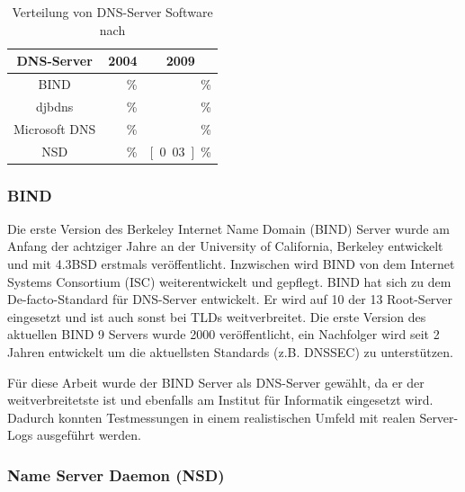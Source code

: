 \documentclass[a4paper, 12pt, BCOR10mm, DIV12, toc=bibliography, toc=listof, german]{scrbook}
\begin{document}
				\begin{table}
					\centering
					\begin{tabular}{|c|r|r|}\hline
						DNS-Server & \multicolumn{1}{c|}{2004} & \multicolumn{1}{c|}{2009} \\\hline\hline
						BIND & \unit[70,11]{\%} & \unit[73,85]{\%} \\
						djbdns & \unit[15,57]{\%} & \unit[2,56]{\%} \\
						Microsoft DNS & \unit[6,24]{\%} & \unit[0,26]{\%}\\
						NSD & \unit[0,20]{\%} & \unit[0.03]{\%} \\\hline
					\end{tabular}
					\caption{Verteilung von DNS-Server Software nach \cite{survey2004, survey2009}}
					\label{tab:verteilung}
				\end{table}

				\subsubsection*{BIND} %

				Die erste Version des Berkeley Internet Name Domain (BIND) \cite{bind} Server wurde am
				Anfang der achtziger Jahre an der University of California, Berkeley entwickelt und mit
				4.3BSD erstmals veröffentlicht. Inzwischen wird BIND von dem Internet Systems Consortium
				(ISC) weiterentwickelt und gepflegt. BIND hat sich zu dem De-facto-Standard für DNS-Server
				entwickelt. Er wird auf 10 der 13 Root-Server eingesetzt und ist auch sonst bei TLDs
				weitverbreitet. Die erste Version des aktuellen BIND 9 Servers wurde 2000 veröffentlicht,
				ein Nachfolger wird seit 2 Jahren entwickelt um die aktuellsten Standards (z.B. DNSSEC) zu
				unterstützen.

				Für diese Arbeit wurde der BIND Server als DNS-Server gewählt, da er der weitverbreitetste ist und
				ebenfalls am Institut für Informatik eingesetzt wird. Dadurch konnten Testmessungen in einem
				realistischen Umfeld mit realen Server-Logs ausgeführt werden. 
				

				\subsubsection*{Name Server Daemon (NSD)} %
\end{document}
